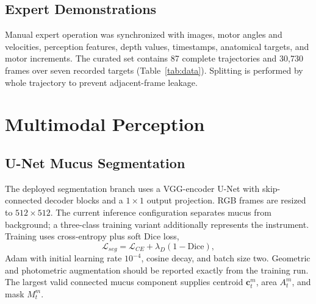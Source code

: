 \documentclass[letterpaper,10pt,conference]{ieeeconf}
\begin{document}
\subsection{Expert Demonstrations}

Manual expert operation was synchronized with images, motor angles and
velocities, perception features, depth values, timestamps, anatomical targets,
and motor increments. The curated set contains 87 complete trajectories and
30,730 frames over seven recorded targets (Table~\ref{tab:data}). Splitting is
performed by whole trajectory to prevent adjacent-frame leakage.

\begin{table}[t]
\caption{Goal-Conditioned Expert Dataset}
\label{tab:data}
\centering\small
{}
\end{table}

\section{Multimodal Perception}

\subsection{U-Net Mucus Segmentation}

The deployed segmentation branch uses a VGG-encoder U-Net with skip-connected
decoder blocks and a $1\!\times\!1$ output projection. RGB frames are resized to
$512\!\times\!512$. The current inference configuration separates mucus from
background; a three-class training variant additionally represents the
instrument. Training uses cross-entropy plus soft Dice loss,
\begin{equation}
 \mathcal{L}_{seg}=\mathcal{L}_{CE}+\lambda_D(1-\mathrm{Dice}),
\end{equation}
Adam with initial learning rate $10^{-4}$, cosine decay, and batch size two.
Geometric and photometric augmentation should be reported exactly from the
training run. The largest valid connected mucus component supplies centroid
$\mathbf{c}^m_t$, area $A^m_t$, and mask $M^m_t$.
\end{document}
